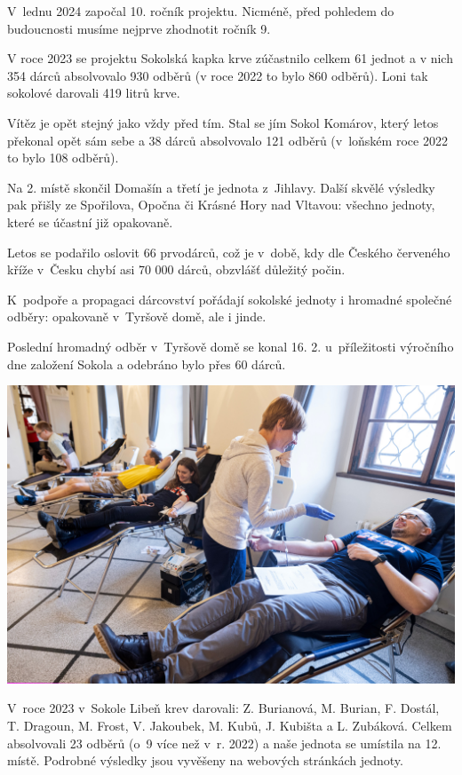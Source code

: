 \documentclass[11pt]{article}
\begin{document}
\clearpage
\pagestyle{standard}

V~lednu 2024 započal 10. ročník projektu. Nicméně, před pohledem do budoucnosti musíme nejprve zhodnotit ročník 9.

V roce 2023 se projektu Sokolská kapka krve zúčastnilo celkem 61 jednot a v nich 354 dárců absolvovalo 930 odběrů (v roce 2022 to bylo 860 odběrů). Loni tak sokolové darovali 419 litrů krve.

Vítěz je opět stejný jako vždy před tím. Stal se jím Sokol Komárov, který letos překonal opět sám sebe a 38 dárců absolvovalo 121 odběrů (v~loňském roce 2022 to bylo 108 odběrů).

Na 2. místě skončil Domašín a třetí je jednota z~Jihlavy. Další skvělé výsledky pak přišly ze Spořilova, Opočna či Krásné Hory nad Vltavou: všechno jednoty, které se účastní již opakovaně.

Letos se podařilo oslovit 66 prvodárců, což je v~době, kdy dle Českého červeného kříže v~Česku chybí asi 70 000 dárců, obzvlášť důležitý počin. 

K~podpoře a propagaci dárcovství pořádají sokolské jednoty i hromadné společné odběry: opakovaně v~Tyršově domě, ale i jinde.

Poslední hromadný odběr v~Tyršově domě se konal 16. 2. u~příležitosti výročního dne založení Sokola a odebráno bylo přes 60 dárců. 

\vfill
\noindent\includegraphics[width=\linewidth]{foto_kapka_krve-scaled.jpg}
\vfill
\clearpage

V~roce 2023 v~Sokole Libeň krev darovali: Z. Burianová, M. Burian, F. Dostál, T. Dragoun, M. Frost, V. Jakoubek, M. Kubů, J. Kubišta a L. Zubáková. Celkem absolvovali 23 odběrů (o~9 více než v~r. 2022) a naše jednota se umístila na 12. místě. Podrobné výsledky jsou vyvěšeny na webových stránkách jednoty. 
\end{document}
